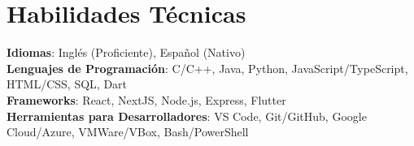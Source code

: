 \documentclass[letterpaper,11pt]{article}
\begin{document}
\section{Habilidades Técnicas}
\begin{itemize}[leftmargin=0.15in, label={}]
  \small{\item{
        \textbf{Idiomas}{: Inglés (Proficiente), Español (Nativo)} \\
        \textbf{Lenguajes de Programación}{: C/C++, Java, Python, JavaScript/TypeScript, HTML/CSS, SQL, Dart} \\
        \textbf{Frameworks}{: React, NextJS, Node.js, Express, Flutter} \\
        \textbf{Herramientas para Desarrolladores}{: VS Code, Git/GitHub, Google Cloud/Azure, VMWare/VBox, Bash/PowerShell}
        }}
\end{itemize}
\end{document}
